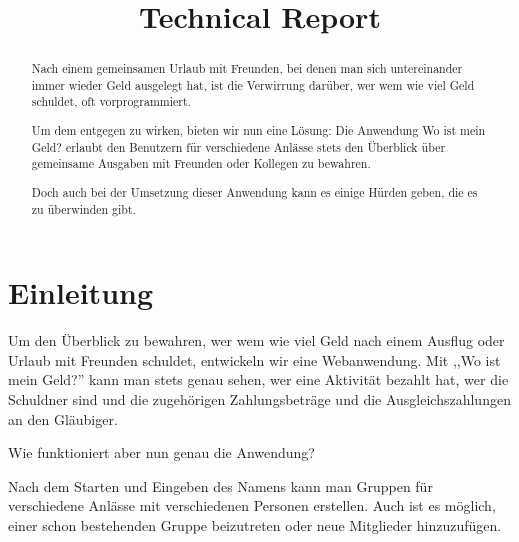 \documentclass[conference]{IEEEtran}
\begin{document}
\title{Technical Report}

\author{
    \and
    \and
    \and
    \and
    \and
    \and
}

\maketitle

\begin{abstract}
    Nach einem gemeinsamen Urlaub mit Freunden, bei denen man sich untereinander
    immer wieder Geld ausgelegt hat, ist die Verwirrung darüber,
    wer wem wie viel Geld schuldet, oft vorprogrammiert.

    Um dem entgegen zu wirken, bieten wir nun eine Lösung: Die Anwendung
    \glqq Wo ist mein Geld?\grqq{} erlaubt den Benutzern für verschiedene Anlässe stets
    den Überblick über gemeinsame Ausgaben mit Freunden oder Kollegen zu
    bewahren.

    Doch auch bei der Umsetzung dieser Anwendung kann es einige Hürden geben, die es zu überwinden gibt.
\end{abstract}

\section{Einleitung}
Um den Überblick zu bewahren, wer wem wie viel Geld nach einem Ausflug oder Urlaub mit Freunden schuldet,
entwickeln wir eine Webanwendung. Mit ,,Wo ist mein Geld?'' kann man stets genau sehen, wer eine Aktivität bezahlt hat,
wer die Schuldner sind und die zugehörigen Zahlungsbeträge und die Ausgleichszahlungen an den \gls{Gläubiger}.

Wie funktioniert aber nun genau die Anwendung?

Nach dem Starten und Eingeben des Namens kann man Gruppen für
verschiedene Anlässe mit verschiedenen Personen erstellen. Auch
ist es möglich, einer schon bestehenden Gruppe beizutreten oder
neue Mitglieder hinzuzufügen.
\end{document}
